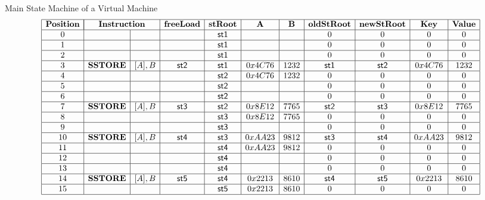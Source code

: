 \begin{frame}{Main State Machine of a Virtual Machine}
\scriptsize
\[
\begin{array}{|c|l|c|c|c|c|c|c|c|c|c|c|}
\hline
\mathbf{Position} & \multicolumn{2}{|c|}{\mathbf{Instruction}} & \mathbf{freeLoad} & \mathbf{stRoot} & \mathbf{A} & \mathbf{B} & \mathbf{oldStRoot} & \mathbf{newStRoot} & \mathbf{Key} & \mathbf{Value} \\ \hline
0 &  &  &  & \mathsf{st1} &  &  & 0 & 0 & 0 & 0 \\ \hline
1 &  &  &  & \mathsf{st1} &  &  & 0 & 0 & 0 & 0 \\ \hline
2 &  &  &  & \mathsf{st1} &  &  & 0 & 0 & 0 & 0 \\ \hline
3 & \mathbf{SSTORE} & [A], B & \mathsf{st2} & \mathsf{st1} & 0x4C76 & 1232 & \mathsf{st1} & \mathsf{st2} & 0x4C76 & 1232 \\ \hline
4 &  &  &  & \mathsf{st2} & 0x4C76 & 1232 & 0 & 0 & 0 & 0 \\ \hline
5 &  &  &  & \mathsf{st2} &  &  & 0 & 0 & 0 & 0 \\ \hline
6 &  &  &  & \mathsf{st2} &  &  & 0 & 0 & 0 & 0 \\ \hline
7 & \mathbf{SSTORE} & [A], B & \mathsf{st3} & \mathsf{st2} & 0x8E12 & 7765 & \mathsf{st2} & \mathsf{st3} & 0x8E12 & 7765 \\ \hline
8 &  &  &  & \mathsf{st3} & 0x8E12 & 7765 & 0 & 0 & 0 & 0 \\ \hline
9 &  &  &  & \mathsf{st3} &  &  & 0 & 0 & 0 & 0 \\ \hline
10 & \mathbf{SSTORE} & [A], B & \mathsf{st4} & \mathsf{st3} & 0xAA23 & 9812 & \mathsf{st3} & \mathsf{st4} & 0xAA23 & 9812 \\ \hline
11 &  &  &  & \mathsf{st4} & 0xAA23 & 9812 & 0 & 0 & 0 & 0 \\ \hline
12 &  &  &  & \mathsf{st4} &  &  & 0 & 0 & 0 & 0 \\ \hline
13 &  &  &  & \mathsf{st4} &  &  & 0 & 0 & 0 & 0 \\ \hline
14 & \mathbf{SSTORE} & [A], B & \mathsf{st5} & \mathsf{st4} & 0x2213 & 8610 & \mathsf{st4} & \mathsf{st5} & 0x2213 & 8610 \\ \hline
15 &  &  &  & \mathsf{st5} & 0x2213 & 8610 & 0 & 0 & 0 & 0 \\ \hline
\end{array}
\]
\end{frame}







